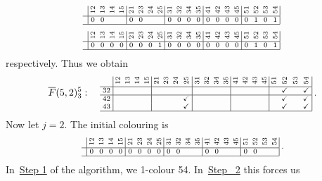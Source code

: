 \documentclass[ALCO,ThmDefs,Unicode,epreuves]{cedram}
\newcommand{\ov}{\overline}
\newcommand{\cm}{\checkmark}
\newcommand{\rt}[1]{\rotatebox{90}{#1}}
\begin{document}
\begin{exam}
\[\] 
 \vspace{1mm}
 \[ 
\text{\setlength{\arraycolsep}{2.7pt}\scriptsize
$\displaystyle 
\begin{array}{c|cccc|cccc|cccc|cccc|cccc|}
 &\rt{12}&\rt{13}&\rt{14}&\rt{15}&\rt{21} &\rt{23}&\rt{24}&\rt{25}&\rt{31}&\rt{32} &\rt{34}&\rt{35}&\rt{41}&\rt{42}&\rt{43} &\rt{45} 
 &\rt{51}&\rt{52}&\rt{53} &\rt{54} \\ \hline 
 &0&0&		&	&0&0&&	&0	&0&0&0	&0	&0&0&0	&0&1&0&1			\\ 
 \hline
\end{array}\; $} 
\] \vspace{1mm}
 \[ 
\text{\setlength{\arraycolsep}{2.7pt}\scriptsize
$\displaystyle 
\begin{array}{c|cccc|cccc|cccc|cccc|cccc|}
 &\rt{12}&\rt{13}&\rt{14}&\rt{15}&\rt{21} &\rt{23}&\rt{24}&\rt{25}&\rt{31}&\rt{32} &\rt{34}&\rt{35}&\rt{41}&\rt{42}&\rt{43} &\rt{45} 
 &\rt{51}&\rt{52}&\rt{53} &\rt{54} \\ \hline 
 &0&0&0		&0	&0&0&0&1	&0	&0&0&0	&0	&0&0&0	&0&1&0&1			\\ 
 \hline
\end{array}\;$} 
\]
respectively. Thus we obtain 
\[ \ov{F}(5,2)^5_3: \quad
\text{\setlength{\arraycolsep}{2.7pt}\scriptsize
$\displaystyle 
\begin{array}{c|cccc|cccc|cccc|cccc|cccc|}
 &\rt{12}&\rt{13}&\rt{14}&\rt{15}&\rt{21} &\rt{23}&\rt{24}&\rt{25}&\rt{31}&\rt{32} &\rt{34}&\rt{35}&\rt{41}&\rt{42}&\rt{43} &\rt{45} 
 &\rt{51}&\rt{52}&\rt{53} &\rt{54} \\ \hline 
 32 	&&&&			&&&&			&& &	&&& &	&		&&\cm&&\cm							\\ \hline
 42 	&&&&			&&&&\cm			&& && && &	&		&&\cm&&\cm				\\ 
 43 	&&&&			&&&&\cm			&& && && &	&		&&\cm&&\cm							\\ 
 \hline
\end{array}\; .$}
\]
Now let $j=2$. The initial colouring is
 \[ 
 \text{\setlength{\arraycolsep}{2.7pt}\scriptsize
$\displaystyle 
\begin{array}{c|cccc|cccc|cccc|cccc|cccc|}
 &\rt{12}&\rt{13}&\rt{14}&\rt{15}&\rt{21} &\rt{23}&\rt{24}&\rt{25}&\rt{31}&\rt{32} &\rt{34}&\rt{35}&\rt{41}&\rt{42}&\rt{43} &\rt{45} 
 &\rt{51}&\rt{52}&\rt{53} &\rt{54} \\ \hline 
 &0&0&0&0	
 &0&0&0&0	
 &0&0&&						 
 &0&0&&
 &0&0&& 	\\ \hline
\end{array}\;.$} 
\] 
In~\hyperlink{prop6.13_S1}{Step 1} of the algorithm, we 1-colour 54. In~\hyperlink{prop6.13_S2}{Step~ 2} this forces us

\end{exam}
\end{document}

